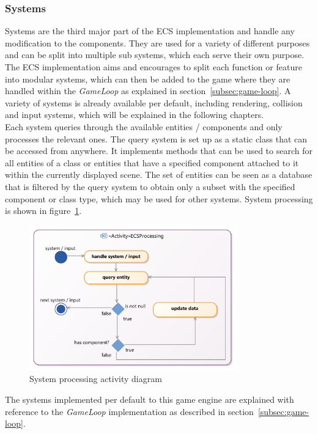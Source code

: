 \subsubsection{Systems}\label{subsubsec:systems}
Systems are the third major part of the \gls{ECS} implementation and handle any modification to the components.
They are used for a variety of different purposes and can be split into multiple sub systems, which each serve their own purpose.
The \gls{ECS} implementation aims and encourages to split each function or feature into modular systems, which can then be added to the game where they
are handled within the \textit{GameLoop} as explained in section~\ref{subsec:game-loop}.
A variety of systems is already available per default, including rendering, collision and input systems, which will be explained in the following chapters.
\\
Each system queries through the available entities / components and only processes the relevant ones.
The query system is set up as a static class that can be accessed from anywhere.
It implements methods that can be used to search for all entities of a class or entities that have a specified component
attached to it within the currently displayed scene.
The set of entities can be seen as a database that is filtered by the query system to obtain only a subset with the specified component or class type, which may be used
for other systems.
System processing is shown in figure~\ref{fig:ecs-system-processing}.
\begin{figure}
    \centering
    \includegraphics[width=0.8\textwidth]{Pictures/res/implementation/ecs-system-processing}
    \caption{System processing activity diagram}
    \label{fig:ecs-system-processing}
\end{figure}
The systems implemented per default to this game engine are explained with reference to the \textit{GameLoop} implementation
as described in section~\ref{subsec:game-loop}.
